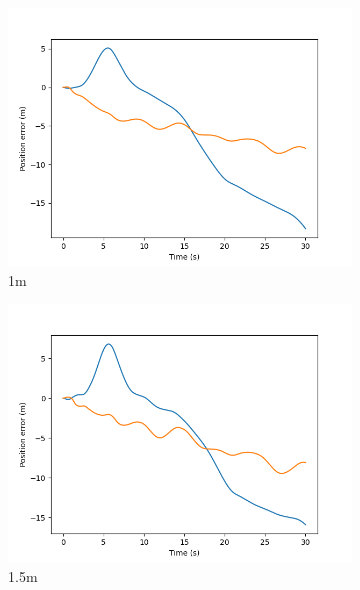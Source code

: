 \documentclass[class=article, crop=false]{standalone}
\begin{document}
\begin{figure}
\begin{subfigure}[b]{0.48\textwidth}
        \includegraphics{scenario1/rov-50m/1.0m/rov_position_error_uncontrolled}
        \caption{1m}
        \label{}
    \end{subfigure}
    \hfill
    \begin{subfigure}[b]{0.48\textwidth}
        \centering
        \includegraphics{scenario1/rov-50m/1.5m/rov_position_error_uncontrolled}
        \caption{1.5m}
        \label{}
    \end{subfigure}
    \vfill
    \begin{subfigure}[b]{0.48\textwidth}
        \centering

\end{subfigure}
\end{figure}
\end{document}
